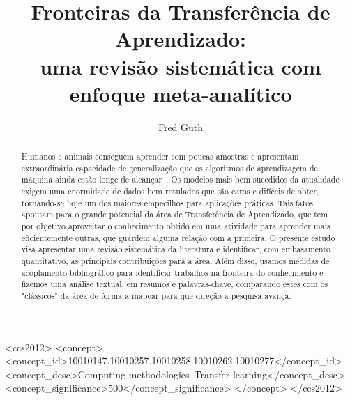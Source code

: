 \documentclass[sigconf]{acmart}
\begin{document}
%
\title[Fronteiras da Transferência de Aprendizado: uma revisão sistemática com enfoque meta-analítico]{Fronteiras da Transferência de Aprendizado: \\
uma revisão sistemática com enfoque meta-analítico}
%

\author{Fred Guth}

\renewcommand{\shortauthors}{Guth, F.}

\begin{abstract}
  Humanos e animais conseguem aprender com poucas amostras e apresentam extraordinária capacidade de generalização que os algoritmos de aprendizagem de máquina ainda estão longe de alcançar~\cite{goodfellow}. Os modelos mais bem sucedidos da atualidade exigem uma enormidade de dados bem rotulados que são caros e difíceis de obter, tornando-se hoje um dos maiores empecilhos para aplicações práticas. Tais fatos apontam para o grande potencial da área de Transferência de Aprendizado, que tem por objetivo aproveitar o conhecimento obtido em uma atividade para aprender mais eficientemente outras, que guardem alguma relação com a primeira. O presente estudo visa apresentar uma revisão sistemática da literatura e identificar, com embasamento quantitativo, as principais contribuições para a área. Além disso, usamos medidas de acoplamento bibliográfico para identificar trabalhos na fronteira do conhecimento e fizemos uma análise textual, em resumos e palavras-chave, comparando estes com os "clássicos" da área de forma a mapear para que direção a pesquisa avança.  
\end{abstract}


\begin{CCSXML}
<ccs2012>
 <concept>
 <concept_id>10010147.10010257.10010258.10010262.10010277</concept_id>
 <concept_desc>Computing methodologies~Transfer learning</concept_desc>
 <concept_significance>500</concept_significance>
 </concept>
</ccs2012>
\end{CCSXML}



\maketitle
\end{document}
